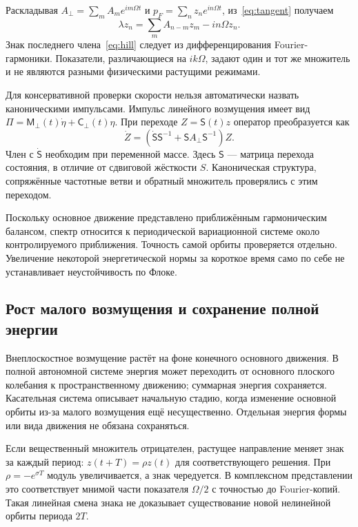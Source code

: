 \documentclass[11pt,a4paper]{article}
\begin{document}
Раскладывая $A_\perp=\sum_m A_m e^{im\Omega t}$ и $p_F=\sum_n z_n e^{in\Omega t}$, из~\eqref{eq:tangent} получаем
\begin{equation}
\lambda z_n=\sum_m A_{n-m}z_m-in\Omega z_n.
\label{eq:hill}
\end{equation}
Знак последнего члена~\eqref{eq:hill} следует из дифференцирования Fourier-гармоники. Показатели, различающиеся на $ik\Omega$, задают один и тот же множитель и не являются разными физическими растущими режимами.

Для консервативной проверки скорости нельзя автоматически назвать каноническими импульсами. Импульс линейного возмущения имеет вид $\Pi=\mathsf M_\perp(t)\dot\eta+\mathsf C_\perp(t)\eta$. При переходе $Z=\mathsf S(t)z$ оператор преобразуется как
\[
\dot Z=(\dot{\mathsf S}\mathsf S^{-1}+\mathsf SA_\perp\mathsf S^{-1})Z.
\]
Член с $\dot{\mathsf S}$ необходим при переменной массе. Здесь $\mathsf S$ --- матрица перехода состояния, в отличие от сдвиговой жёсткости $S$. Каноническая структура, сопряжённые частотные ветви и обратный множитель проверялись с этим переходом.

Поскольку основное движение представлено приближённым гармоническим балансом, спектр относится к периодической вариационной системе около контролируемого приближения. Точность самой орбиты проверяется отдельно. Увеличение некоторой энергетической нормы за короткое время само по себе не устанавливает неустойчивость по Флоке.

\subsection{Рост малого возмущения и сохранение полной энергии}
Внеплоскостное возмущение растёт на фоне конечного основного движения. В полной автономной системе энергия может переходить от основного плоского колебания к пространственному движению; суммарная энергия сохраняется. Касательная система описывает начальную стадию, когда изменение основной орбиты из-за малого возмущения ещё несущественно. Отдельная энергия формы или вида движения не обязана сохраняться.

Если вещественный множитель отрицателен, растущее направление меняет знак за каждый период: $z(t+T)=\rho z(t)$ для соответствующего решения. При $\rho=-e^{\sigma T}$ модуль увеличивается, а знак чередуется. В комплексном представлении это соответствует мнимой части показателя $\Omega/2$ с точностью до Fourier-копий. Такая линейная смена знака не доказывает существование новой нелинейной орбиты периода $2T$.
\end{document}

